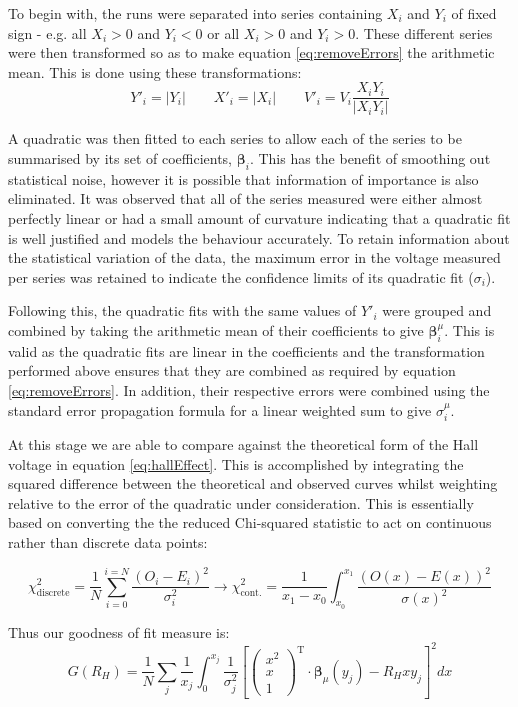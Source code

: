 \documentclass{article}
\begin{document}
		To begin with, the runs were separated into series containing $X_i$ and $Y_i$ of fixed sign - e.g. all $X_i>0$ and $Y_i<0$ or all $X_i>0$ and $Y_i>0$. These different series were then transformed so as to make equation \ref{eq:removeErrors} the arithmetic mean. This is done using these transformations:
		\[Y'_i = |Y_i| \qquad X'_i = |X_i| \qquad V'_i = V_i\frac{X_iY_i}{|X_iY_i|}\]
		
		A quadratic was then fitted to each series to allow each of the series to be summarised by its set of coefficients, $\boldsymbol{\beta}_i$. This has the benefit of smoothing out statistical noise, however it is possible that information of importance is also eliminated. It was observed that all of the series measured were either almost perfectly linear or had a small amount of curvature indicating that a quadratic fit is well justified and models the behaviour accurately. To retain information about the statistical variation of the data, the maximum error in the voltage measured per series was retained to indicate the confidence limits of its quadratic fit ($\sigma_i$).
		
		Following this, the quadratic fits with the same values of $Y'_i$ were grouped and combined by taking the arithmetic mean of their coefficients to give $\boldsymbol{\beta}^\mu_i$. This is valid as the quadratic fits are linear in the coefficients and the transformation performed above ensures that they are combined as required by equation \ref{eq:removeErrors}. In addition, their respective errors were combined using the standard error propagation formula for a linear weighted sum to give $\sigma^\mu_i$.
		
		At this stage we are able to compare against the theoretical form of the Hall voltage in equation \ref{eq:hallEffect}. This is accomplished by integrating the squared difference between the theoretical and observed curves whilst weighting relative to the error of the quadratic under consideration. This is essentially based on converting the the reduced Chi-squared statistic to act on continuous rather than discrete data points:
		
		\begin{equation}
			\chi^2_{\textrm{discrete}} = \frac{1}{N}\sum_{i=0}^{i=N}\frac{(O_i-E_i)^2}{\sigma_i^2} \rightarrow \chi^2_{\textrm{cont.}} = \frac{1}{x_1-x_0}\int_{x_0}^{x_1}\frac{(O(x)-E(x))^2}{\sigma(x)^2}
		\end{equation}
		
		\noindent Thus our goodness of fit measure is:
		\begin{equation}
			G(R_H) = \frac{1}{N}\sum_j\frac{1}{x_j}\int_{0}^{x_j}\frac{1}{\sigma_j^2}\left[\begin{pmatrix} x^2 \\ x \\ 1\end{pmatrix}^\mathrm{T}\cdot\boldsymbol{\beta}_\mu(y_j) - R_Hxy_j\right]^2 dx
		\end{equation}
		
\end{document}
